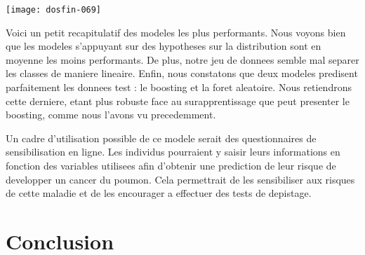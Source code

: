 \documentclass[a4paper,11pt]{article}
\begin{document}
\begin{center}
\texttt{[image: dosfin-069]}

\end{center}

Voici un petit recapitulatif des modeles les plus performants.  
Nous voyons bien que les modeles s'appuyant sur des hypotheses sur la distribution sont en moyenne les moins performants.  
De plus, notre jeu de donnees semble mal separer les classes de maniere lineaire.  
Enfin, nous constatons que deux modeles predisent parfaitement les donnees test : le boosting et la foret aleatoire.  
Nous retiendrons cette derniere, etant plus robuste face au surapprentissage que peut presenter le boosting, comme nous l'avons vu precedemment.  

Un cadre d'utilisation possible de ce modele serait des questionnaires de sensibilisation en ligne.  
Les individus pourraient y saisir leurs informations en fonction des variables utilisees afin d'obtenir une prediction de leur risque de developper un cancer du poumon.  
Cela permettrait de les sensibiliser aux risques de cette maladie et de les encourager a effectuer des tests de depistage.

\newpage

\section{Conclusion}
\end{document}
